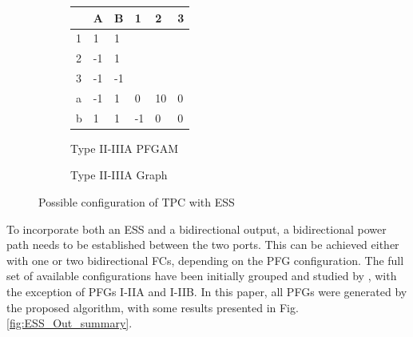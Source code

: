 \documentclass[conference]{IEEEtran}
\begin{document}
\begin{figure}    
        \begin{subfigure}{0.45\columnwidth}\centering
        {\footnotesize\begin{tabular}{| m{2pt} || m{7pt} | m{7pt}| m{7pt} | m{7pt} | m{7pt}  ||} 
         \hline
         & A & B & 1 & 2 & 3 \\ [0.5ex] 
         \hline\hline
         1 & \cellcolor{red!30}1 & \cellcolor{red!30}1 &  \cellcolor{gray!30} &  \cellcolor{gray!30} &  \cellcolor{gray!30} \\ 
         \hline
         2 & \cellcolor{red!30}-1 &\cellcolor{red!30} 1 & \cellcolor{gray!30} &  \cellcolor{gray!30} &  \cellcolor{gray!30}\\
         \hline
         3 & -1 & -1 & \cellcolor{gray!30} &  \cellcolor{gray!30} &  \cellcolor{gray!30}\\
         \hline
         a & -1 & 1 & 0 & \cellcolor{cyan!30}10 & 0\\
         \hline
         b & 1 & 1 & -1 & 0 & 0\\
      \hline\hline
        \end{tabular}}\caption{Type II-IIIA PFGAM}\end{subfigure}
        \begin{subfigure}{0.65\columnwidth}\centering
         \caption{Type II-IIIA Graph}
        \end{subfigure}\hfill
        \caption{Possible configuration of TPC with ESS}\label{fig:ESS_summary}
\end{figure} 
To incorporate both an ESS and a bidirectional output, a bidirectional power path needs to be established between the two ports. This can be achieved either with one or two bidirectional FCs, depending on the PFG configuration. The full set of available configurations have been initially grouped and studied by \cite{aljarajreh_synthesis_2021}, with the exception of PFGs I-IIA and I-IIB. In this paper, all PFGs were generated by the proposed algorithm, with some results presented in Fig. \ref{fig:ESS_Out_summary}.
\end{document}
